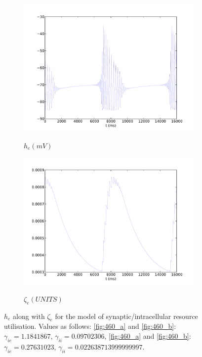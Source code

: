 \documentclass[a4paper,12pt]{article}
\begin{document}
\begin{figure}
\begin{subfigure}[b]{0.5\textwidth}
		\includegraphics[scale=0.35]{chosen-frontiers-2012/00460-0_7-he-intra.pdf}
		\label{fig:460_c}
		\caption{$h_e (mV)$}
	\end{subfigure}
	\begin{subfigure}[b]{0.5\textwidth}
		\includegraphics[scale=0.35]{chosen-frontiers-2012/00460-0_7-slow-intra.pdf}
		\label{fig:460_d}
		\caption{$\zeta_e (UNITS)$}
	\end{subfigure}
      \label{fig:emerging_slow_zeta}
	\caption{$h_e$ along with $\zeta_e$ for the model of synaptic/intracellular resource utilisation. 
	Values as follows:
	\ref{fig:460_a} and \ref{fig:460_b}: $\gamma_{ie}=1.1841867$, $\gamma_{ii}=0.09702306$, \ref{fig:460_a} and \ref{fig:460_b}:  $\gamma_{ie}=0.27631023$, $\gamma_{ii}=0.022638713999999997$. 
}
\end{figure}
\end{document}
